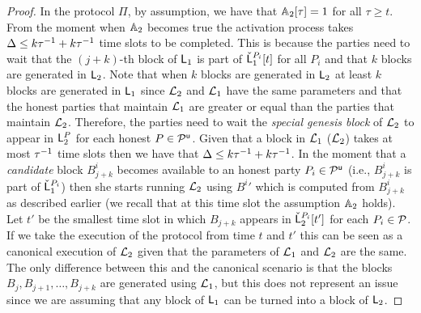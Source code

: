 \begin{proof}
In the protocol $\Pi$, by assumption, we have that $\mathbb{A}_2[\tau]=1$ for all $\tau \geq t$. 
From the moment when $\mathbb{A}_2$ becomes true the activation process takes $\Delta\leq k \tau^{-1} + k \tau^{-1}$  time slots to be completed.
This is because the parties need to wait that the $(j+k)$-th block of $\mathsf{L}_1$ is part of $\check {\mathsf{L}}_1^{P_i}[t]$  for all $P_i$ and that $k$ blocks are generated in $\mathsf{L}_2$. Note that when $k$ blocks are generated in $\mathsf{L}_2$ at least 
$k$ blocks are generated in $\mathsf{L}_1$ since $\mathcal{L}_2$ and $\mathcal{L}_1$ have the same parameters and that the honest parties that maintain $\mathcal{L}_1$ are greater or equal than the parties that maintain $\mathcal{L}_2$. Therefore, the parties need to wait the \emph{special genesis block} of $\mathcal{L}_2$ to appear 
in $\mathsf{L}_2^P$ for each honest $P\in\mathcal{P}^\mathsf{u}$. Given that a block in $\mathcal{L}_1$ ($\mathcal{L}_2$) takes at most $\tau^{-1}$ time slots then we have that $\Delta \leq k \tau^{-1} + k \tau^{-1}$.
In the moment that a \emph{candidate} block $B^i_{j+k}$ becomes available to an honest party $P_i\in\mathcal{P}^\mathsf{u}$ (i.e., $B^i_{j+k}$ is part of $\check {\mathsf{L}}_1^{P_i}$) then she starts running $\mathcal{L}_2$
using ${B^i}'$ which is computed from $B^i_{j+k}$ as described earlier (we recall that at this time slot the assumption $\mathbb{A}_2$ holds).
Let $t'$ be the smallest time slot in which $B_{j+k}$ appears in $\check {\mathsf{L}}_2^{P_i}[t']$
 for each $P_i\in\mathcal{P}$.
If we take the execution of the protocol from time $t$ and $t'$ this can be seen as a canonical execution of $\mathcal{L}_2$ given
that the parameters of $\mathcal{L}_1$ and $\mathcal{L}_2$ are the same. The only difference between this and the canonical scenario is
that the blocks $B_{j}, B_{j+1},\dots, B_{j+k}$  are generated using $\mathcal{L}_1$, but this does not represent an issue since we are assuming that
any block of $\mathsf{L}_1$ can be turned into a block of $\mathsf{L}_2$. \end{proof}









